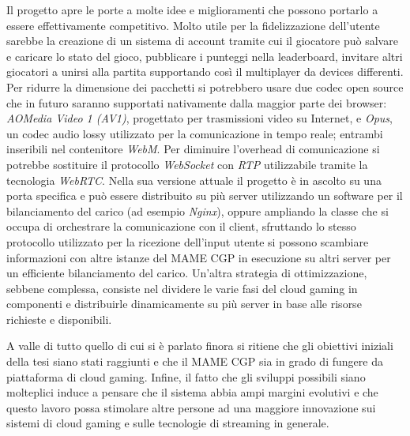Il progetto apre le porte a molte idee e miglioramenti che possono portarlo a essere effettivamente competitivo. Molto utile per la fidelizzazione dell'utente sarebbe la creazione di un sistema di account tramite cui il giocatore può salvare e caricare lo stato del gioco, pubblicare i punteggi nella leaderboard, invitare altri giocatori a unirsi alla partita supportando così il multiplayer da devices differenti. Per ridurre la dimensione dei pacchetti si potrebbero usare due codec open source che in futuro saranno supportati nativamente dalla maggior parte dei browser: \textit{AOMedia Video 1 (AV1)}, progettato per trasmissioni video su Internet, e \textit{Opus}, un codec audio lossy utilizzato per la comunicazione in tempo reale; entrambi inseribili nel contenitore \textit{WebM}. Per diminuire l'overhead di comunicazione si potrebbe sostituire il protocollo \textit{WebSocket} con \textit{RTP} utilizzabile tramite la tecnologia \textit{WebRTC}. Nella sua versione attuale il progetto è in ascolto su una porta specifica e può essere distribuito su più server utilizzando un software per il bilanciamento del carico (ad esempio \textit{Nginx}), oppure ampliando la classe che si occupa di orchestrare la comunicazione con il client, sfruttando lo stesso protocollo utilizzato per la ricezione dell'input utente si possono scambiare informazioni con altre istanze del MAME CGP in esecuzione su altri server per un efficiente bilanciamento del carico. Un'altra strategia di ottimizzazione, sebbene complessa, consiste nel dividere le varie fasi del cloud gaming in componenti e distribuirle dinamicamente su più server in base alle risorse richieste e disponibili.

A valle di tutto quello di cui si è parlato finora si ritiene che gli obiettivi iniziali della tesi siano stati raggiunti e che il MAME CGP sia in grado di fungere da piattaforma di cloud gaming. Infine, il fatto che gli sviluppi possibili siano molteplici induce a pensare che il sistema abbia ampi margini evolutivi e che questo lavoro possa stimolare altre persone ad una maggiore innovazione sui sistemi di cloud gaming e sulle tecnologie di streaming in generale.